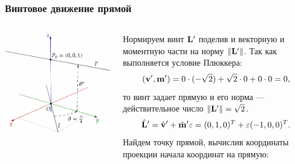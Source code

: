 \begin{frame}
  \frametitle{Винтовое движение прямой}
  \begin{columns}
    \begin{column}{0.4\textwidth}
      \begin{center}
        \includegraphics[width=\textwidth]{img/screws/moment07}
      \end{center}
    \end{column}
    \begin{column}{0.6\textwidth}
      Нормируем винт $\vb{L}^{\prime}$ поделив и векторную и моментную части на норму $\norm{\vb{L}^{\prime}}$. Так как выполняется условие Плюккера:
      \begin{equation*}
        (\vb{v}^{\prime}, \vb{m}^{\prime}) = 0 \cdot (-\sqrt{2}) + \sqrt{2} \cdot 0 + 0\cdot 0 = 0,
      \end{equation*}
      то винт задает прямую и его норма — действительное число $\norm{\vb{L}^{\prime}} = \sqrt{2}$.
      \begin{equation*}
        \hat{\vb{L}}^{\prime} = \hat{\vb{v}}^{\prime} + \hat{\vb{m}}^{\prime}\varepsilon = (0, 1, 0)^T + \varepsilon (-1, 0, 0)^T.
      \end{equation*}
      Найдем точку прямой, вычислив координаты проекции начала координат на прямую:
      \begin{equation*}

\end{equation*}
\end{column}
\end{columns}
\end{frame}

